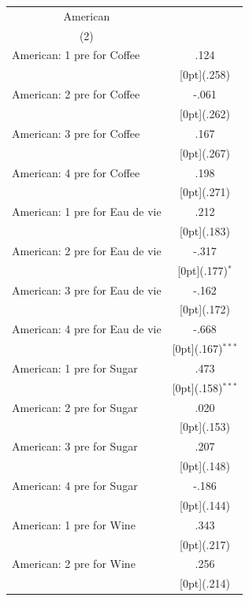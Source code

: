 \documentclass[12pt,a4paper,titlepage]{article}
\begin{document}
{\newpage
{}
\begin{tabular*}{\textwidth}{@{\extracolsep{\fill}}lc}	
	\multicolumn{1}{c}{American} \\
\cline{2-2}	
	\multicolumn{1}{c}{(2)} \\
\hline	
American: 1 pre for Coffee &	.124 \\
&	\raisebox{.7ex}[0pt]{\scriptsize (.258)} \\
American: 2 pre for Coffee &	-.061 \\
&	\raisebox{.7ex}[0pt]{\scriptsize (.262)} \\
American: 3 pre for Coffee &	.167 \\
&	\raisebox{.7ex}[0pt]{\scriptsize (.267)} \\
American: 4 pre for Coffee &	.198 \\
&	\raisebox{.7ex}[0pt]{\scriptsize (.271)} \\
American: 1 pre for Eau de vie &	.212 \\
&	\raisebox{.7ex}[0pt]{\scriptsize (.183)} \\
American: 2 pre for Eau de vie &	-.317 \\
&	\raisebox{.7ex}[0pt]{\scriptsize (.177)$^{*}$} \\
American: 3 pre for Eau de vie &	-.162 \\
&	\raisebox{.7ex}[0pt]{\scriptsize (.172)} \\
American: 4 pre for Eau de vie &	-.668 \\
&	\raisebox{.7ex}[0pt]{\scriptsize (.167)$^{***}$} \\
American: 1 pre for Sugar &	.473 \\
&	\raisebox{.7ex}[0pt]{\scriptsize (.158)$^{***}$} \\
American: 2 pre for Sugar &	.020 \\
&	\raisebox{.7ex}[0pt]{\scriptsize (.153)} \\
American: 3 pre for Sugar &	.207 \\
&	\raisebox{.7ex}[0pt]{\scriptsize (.148)} \\
American: 4 pre for Sugar &	-.186 \\
&	\raisebox{.7ex}[0pt]{\scriptsize (.144)} \\
American: 1 pre for Wine &	.343 \\
&	\raisebox{.7ex}[0pt]{\scriptsize (.217)} \\
American: 2 pre for Wine &	.256 \\
&	\raisebox{.7ex}[0pt]{\scriptsize (.214)} \\

\end{tabular*}}
\end{document}
